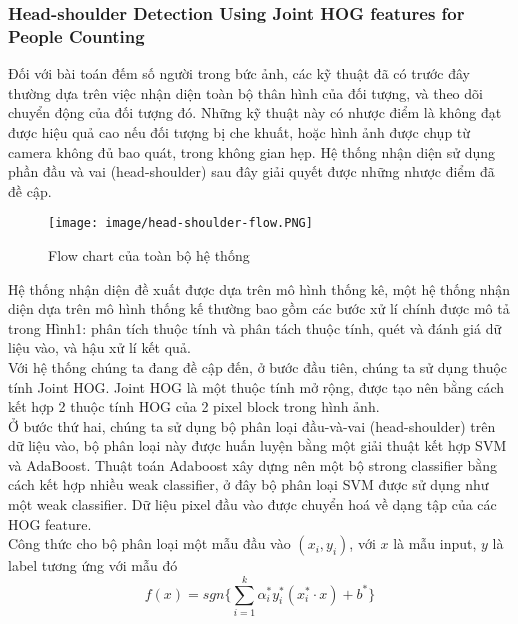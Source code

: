 \documentclass[12pt,a4paper]{article}
\begin{document}
        \subsubsection{Head-shoulder Detection Using Joint HOG features for People Counting \cite{Head-shoulder}}
        Đối với bài toán đếm số người trong bức ảnh, các kỹ thuật đã có trước đây thường dựa trên việc nhận diện toàn bộ thân hình của đối tượng, và theo dõi chuyển động của đối tượng đó. Những kỹ thuật này có nhược điểm là không đạt được hiệu quả cao nếu đối tượng bị che khuất, hoặc hình ảnh được chụp từ camera không đủ bao quát, trong không gian hẹp. Hệ thống nhận diện sử dụng phần đầu và vai (head-shoulder) sau đây giải quyết được những nhược điểm đã đề cập. \\
        \begin{figure}[!ht]
            \centering
            \texttt{[image: image/head-shoulder-flow.PNG]}
            \caption{Flow chart của toàn bộ hệ thống \cite{Head-shoulder}}
            \label{fig:head_shoulder}
        \end{figure}
        Hệ thống nhận diện đề xuất được dựa trên mô hình thống kê, một hệ thống nhận diện dựa trên mô hình thống kế thường bao gồm các bước xử lí chính được mô tả trong Hình1: phân tích thuộc tính và phân tách thuộc tính, quét và đánh giá dữ liệu vào, và hậu xử lí kết quả. \\

Với hệ thống chúng ta đang đề cập đến, ở bước đầu tiên, chúng ta sử dụng thuộc tính Joint HOG. Joint HOG là một thuộc tính mở rộng, được tạo nên bằng cách kết hợp 2 thuộc tính HOG của 2 pixel block trong hình ảnh.\\

Ở bước thứ hai, chúng ta sử dụng bộ phân loại đầu-và-vai (head-shoulder) trên dữ liệu vào, bộ phân loại này được huấn luyện bằng một giải thuật kết hợp SVM và AdaBoost. Thuật toán Adaboost xây dựng nên một bộ strong classifier bằng cách kết hợp nhiều weak classifier, ở đây bộ phân loại SVM được sử dụng như một weak classifier. Dữ liệu pixel đầu vào được chuyển hoá về dạng tập của các HOG feature.\\

 Công thức cho bộ phân loại một mẫu đầu vào $(x_i,y_i)$, với $x$ là mẫu input, $y$ là label tương ứng với mẫu đó
 \begin{equation}
     f(x) = sgn\{\sum_{i=1}^{k}\alpha^{*}_iy^{*}_i(x^{*}_i \cdot {x}) + b^{*}\}
 \end{equation}
\end{document}
